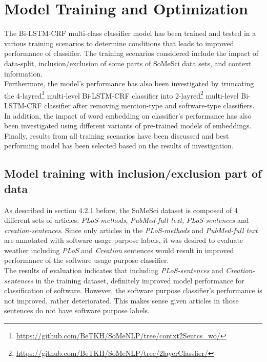\chapter{Model Training and Optimization}
\label{ch:chapter06}
 
%
%

The \ac{Bi-LSTM-CRF} multi-class classifier model has been trained and tested in a various training scenarios to determine conditions that leads to improved performance of classifier. 
The training scenarios considered include the impact of data-split, inclusion/exclusion of some parts of SoMeSci data sets, and context information. \\ 

Furthermore, the model’s performance has also been investigated by truncating the 4-layred\footnote{\url{https://github.com/BeTKH/SoMeNLP/tree/contxt2Sentcs_wo/}} multi-level Bi-LSTM-CRF classifier into 2-layred\footnote{\url{https://github.com/BeTKH/SoMeNLP/tree/2layerClassfier/}} multi-level Bi-LSTM-CRF classifier after removing mention-type and software-type classifiers. 
In addition, the impact of word embedding on classifier’s performance  has also been investigated using different variants of pre-trained models of embeddings. \\

Finally, results from all training scenarios have been discussed and best performing model has been selected based on the results of investigation.



\section{Model training with inclusion/exclusion part of data}
\label{sec:chapter06:exclusion}

As described in section 4.2.1 before, the SoMeSci dataset is composed of 4 different sets of articles: \emph{PLoS-methods}, \emph{PubMed-full text}, \emph{ PLoS-sentences} and \emph{creation-sentences}. Since only articles in the  \emph{PLoS-methods} and \emph{PubMed-full text} are annotated with software usage purpose labels, it was desired to evaluate weather including \emph{PLoS} and \emph{Creation} sentences would result in improved performance of the software usage purpose classifier.   \\

The results of evaluation indicates that including \emph{PLoS-sentences} and \emph{Creation-sentences} in the training dataset, definitely improved model performance for classification of software. However, the software purpose classifier’s performance is not improved, rather deteriorated. This makes sense given articles in those sentences do not have software purpose labels. \\

